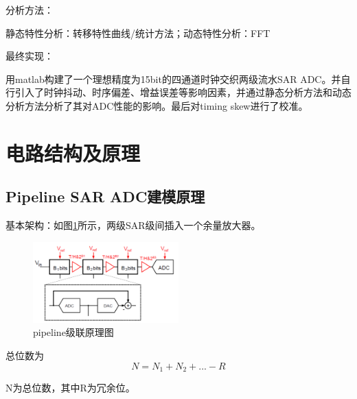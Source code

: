 \documentclass[cs4size,a4paper]{ctexart}
\numberwithin{equation}{section}
\numberwithin{table}{section}
\numberwithin{figure}{section}
\begin{document}
\noindent
分析方法：

静态特性分析：转移特性曲线/统计方法；动态特性分析：FFT

\noindent
最终实现：

用matlab构建了一个理想精度为15bit的四通道时钟交织两级流水SAR ADC。并自行引入了时钟抖动、时序偏差、增益误差等影响因素，并通过静态分析方法和动态分析方法分析了其对ADC性能的影响。最后对timing skew进行了校准。

\newpage
\section{电路结构及原理}

    \subsection{Pipeline SAR ADC建模原理}
        基本架构：如图\ref{fig:circuit1}所示，两级SAR级间插入一个余量放大器。
        	\begin{figure}[H]
        		\centering
        		\includegraphics[width=0.5\textwidth]{figure/circuit1.jpg}
        		\caption{pipeline级联原理图} \label{fig:circuit1}
        	\end{figure}
        	
        总位数为
            \begin{equation}
                N=N_1+N_2+...-R
            \end{equation}
            
        N为总位数，其中R为冗余位。
        
\end{document}
